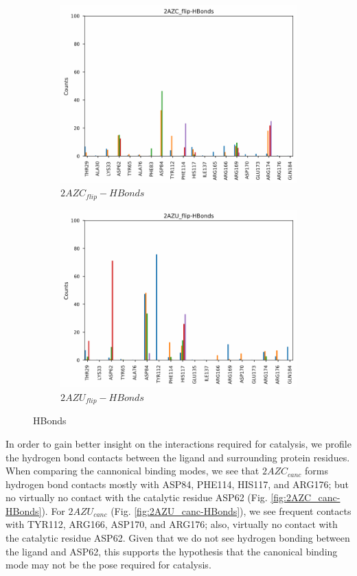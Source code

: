 \documentclass[fleqn,10pt]{wlscirep}
\begin{document}
\begin{figure}[!ht]
\begin{subfigure}{.45\textwidth}
     \includegraphics[width=.95\linewidth]{2AZC_flip/2AZC_flip-HBonds.pdf}
     \caption{$2AZC_{flip}-HBonds$}
     \label{fig:2AZC_flip-HBonds}
   \end{subfigure}
    \begin{subfigure}{.45\textwidth}
     \centering
     \includegraphics[width=.95\linewidth]{2AZU_flip/2AZU_flip-HBonds.pdf}
     \caption{$2AZU_{flip}-HBonds$}
     \label{fig:2AZU_flip-HBonds}
   \end{subfigure}
\caption{HBonds}
\label{fig:HBonds}
\end{figure}  

In order to gain better insight on the interactions required for catalysis, we profile the hydrogen bond contacts between the ligand and surrounding protein residues.
When comparing the cannonical binding modes, we see that $2AZC_{canc}$ forms hydrogen bond contacts mostly with ASP84, PHE114, HIS117, and ARG176; but no virtually no contact with the catalytic residue ASP62 (Fig. \ref{fig:2AZC_canc-HBonds}).
For $2AZU_{canc}$ (Fig. \ref{fig:2AZU_canc-HBonds}), we see frequent contacts with TYR112, ARG166, ASP170, and ARG176; also, virtually no contact with the catalytic residue ASP62.
Given that we do not see hydrogen bonding between the ligand and ASP62, this supports the hypothesis that the canonical binding mode may not be the pose required for catalysis.
\end{document}
